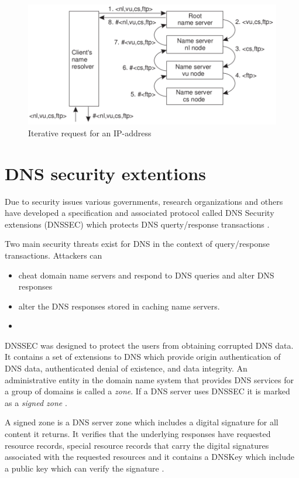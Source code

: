 \documentclass[a4paper,10pt]{report}
\begin{document}
\begin{figure}[H]
\centering
\includegraphics[scale=0.7]{recursiv}
\caption{Iterative request for an IP-address}
\label{fig:recursiv}
\end{figure}


\newpage
\section{DNS security extentions}\label{sec:DNS-security}
Due to security issues various governments, research organizations and others have developed a specification and associated protocol called DNS Security extensions (DNSSEC) which protects DNS querty/response transactions \cite[p. 84]{DNS-article}.

Two main security threats exist for DNS in the context of query/response transactions. Attackers can

	\begin{itemize}%
	\item cheat domain name servers and respond to DNS queries and alter DNS responses

	\item alter the DNS responses stored in caching name servers.
	\item[] \hspace{100mm}\cite[p. 84]{DNS-article}
	\end{itemize} 
DNSSEC was designed to protect the users from obtaining corrupted DNS data. 
It contains a set of extensions to DNS which provide origin authentication of DNS data, authenticated denial of existence, and data integrity. An administrative entity in the domain name system that provides DNS services for a group of domains is called a \textit{zone}.
If a DNS server uses DNSSEC it is marked as a \textit{signed zone} \cite{DNS-article}.



A signed zone is a DNS server zone which includes a digital signature for all content it returns.
It verifies that the underlying responses have requested resource records, special resource records that carry the digital signatures associated with the requested resources and it contains a DNSKey which include a public key which can verify the signature \cite{DNS-article}.
\end{document}
